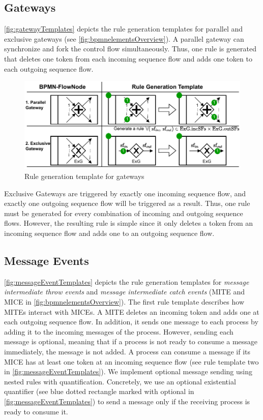 \documentclass[runningheads]{lmcs}
\begin{document}
\subsection{Gateways}
\autoref{fig:gatewayTemplates} depicts the rule generation templates for parallel and exclusive gateways (see \autoref{fig:bpmnelementsOverview}).
A parallel gateway can synchronize and fork the control flow simultaneously.
Thus, one rule is generated that deletes one token from each incoming sequence flow and adds one token to each outgoing sequence flow.

\begin{figure}[ht]
    \centering
    \includegraphics[width=1\textwidth]{images/gateways_template.pdf}
    \caption{Rule generation template for gateways}
    \label{fig:gatewayTemplates}
\end{figure}

Exclusive Gateways are triggered by exactly one incoming sequence flow, and exactly one outgoing sequence flow will be triggered as a result.
Thus, one rule must be generated for every combination of incoming and outgoing sequence flows.
However, the resulting rule is simple since it only deletes a token from an incoming sequence flow and adds one to an outgoing sequence flow.

\subsection{Message Events}
\autoref{fig:messageEventTemplates} depicts the rule generation templates for \textit{message intermediate throw events} and \textit{message intermediate catch events} (\textsf{MITE} and \textsf{MICE} in \autoref{fig:bpmnelementsOverview}).
The first rule template describes how MITEs interact with MICEs.
A MITE deletes an incoming token and adds one at each outgoing sequence flow.
In addition, it sends one message to each process by adding it to the incoming messages of the process.
However, sending each message is optional, meaning that if a process is not ready to consume a message immediately, the message is not added.
A process can consume a message if its MICE has at least one token at an incoming sequence flow (see rule template two in \autoref{fig:messageEventTemplates}).
We implement optional message sending using nested rules with quantification.
Concretely, we use an optional existential quantifier \cite{rensinkNestedQuantificationGraph2006} (see blue dotted rectangle marked with optional in \autoref{fig:messageEventTemplates}) to send a message only if the receiving process is ready to consume it.
\end{document}
